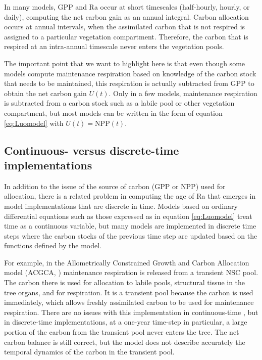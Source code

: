\documentclass[12pt, a4paper]{article}
\begin{document}
In many models, GPP and Ra occur at short timescales (half-hourly, hourly, or daily), computing the net carbon gain as an annual integral. Carbon allocation occurs at annual intervals, when the assimilated carbon that is not respired is assigned to a particular vegetation compartment. Therefore, the carbon that is respired at an intra-annual timescale never enters the vegetation pools.

The important point that we want to highlight here is that even though some models compute maintenance respiration based on knowledge of the carbon stock that needs to be maintained, this respiration is actually subtracted from GPP to obtain the net carbon gain $U(t)$. Only in a few models, maintenance respiration is subtracted from a carbon stock such as a labile pool or other vegetation compartment, but most models can be written in the form of equation \eqref{eq:Luomodel} with $U(t) = \mathrm{NPP}(t)$. 

\subsection{Continuous- versus discrete-time implementations}
In addition to the issue of the source of carbon (GPP or NPP) used for allocation, there is a related problem in computing the age of Ra that emerges in model implementations that are discrete in time. 
Models based on ordinary differential equations such as those expressed as in equation \eqref{eq:Luomodel} treat time as a continuous variable, but many models are implemented in discrete time steps where the carbon stocks of the previous time step are updated based on the functions defined by the model. %

For example, in the Allometrically Constrained Growth and Carbon Allocation model (ACGCA, \citet{Ogle2009}) maintenance respiration is released from a transient NSC pool.
The carbon there is used for allocation to labile pools, structural tissue in the tree organs, and for respiration.
It is a transient pool because the carbon is used immediately, which allows freshly assimilated carbon to be used  for maintenance respiration.
There are no issues with this implementation in continuous-time \citep{Herrera2020}, but in discrete-time implementations, at a one-year time-step in particular, a large portion of the carbon from the transient pool
never enters the tree.
The net carbon balance is still correct, but the model does not describe accurately the temporal dynamics of the carbon in the transient pool.
\end{document}
